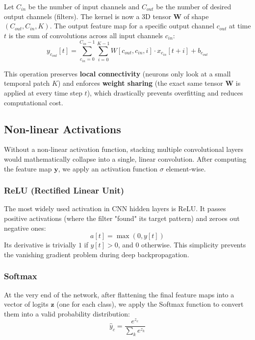 Let $C_{in}$ be the number of input channels and $C_{out}$ be the number of desired output channels (filters). The kernel is now a 3D tensor $\mathbf{W}$ of shape $(C_{out}, C_{in}, K)$. The output feature map for a specific output channel $c_{out}$ at time $t$ is the sum of convolutions across all input channels $c_{in}$:
\begin{equation}
    y_{c_{out}}[t] = \sum_{c_{in}=0}^{C_{in}-1} \sum_{i=0}^{K-1} W[c_{out}, c_{in}, i] \cdot x_{c_{in}}[t + i] + b_{c_{out}}
\end{equation}

This operation preserves \textbf{local connectivity} (neurons only look at a small temporal patch $K$) and enforces \textbf{weight sharing} (the exact same tensor $\mathbf{W}$ is applied at every time step $t$), which drastically prevents overfitting and reduces computational cost.

\subsection{Non-linear Activations}
Without a non-linear activation function, stacking multiple convolutional layers would mathematically collapse into a single, linear convolution. After computing the feature map $\mathbf{y}$, we apply an activation function $\sigma$ element-wise.

\subsubsection{ReLU (Rectified Linear Unit)}
The most widely used activation in CNN hidden layers is ReLU. It passes positive activations (where the filter "found" its target pattern) and zeroes out negative ones:
\begin{equation}
    a[t] = \max(0, y[t])
\end{equation}
Its derivative is trivially $1$ if $y[t] > 0$, and $0$ otherwise. This simplicity prevents the vanishing gradient problem during deep backpropagation.

\subsubsection{Softmax}
At the very end of the network, after flattening the final feature maps into a vector of logits $\mathbf{z}$ (one for each class), we apply the Softmax function to convert them into a valid probability distribution:
\begin{equation}
    \hat{y}_c = \frac{e^{z_c}}{\sum_k e^{z_k}}
\end{equation}

